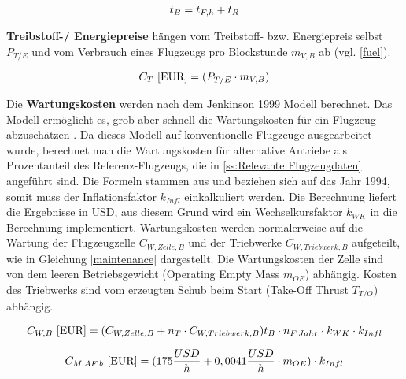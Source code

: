 \begin{equation}
   t_{B} = t_{F,h} + t_{R} \\
   \label{blockzeit}
\end{equation}

\textbf{Treibstoff-/ Energiepreise} hängen vom Treibstoff- bzw. Energiepreis selbst $P_{T/E}$ und vom Verbrauch 
eines Flugzeugs pro Blockstunde $m_{V,B}$ ab (vgl. \eqref{fuel}).

\begin{equation}
   {C_T ~[\text{EUR}]} = (P_{T/E} \cdot m_{V,B}) \\
   \label{fuel}
\end{equation}

Die \textbf{Wartungskosten} werden nach dem Jenkinson 1999 Modell berechnet. Das Modell ermöglicht es, grob aber schnell die Wartungskosten 
für ein Flugzeug abzuschätzen \cite{bruge2018wartungskosten}.
Da dieses Modell auf konventionelle Flugzeuge ausgearbeitet wurde, berechnet man die Wartungskosten für alternative Antriebe
als Prozentanteil des Referenz-Flugzeugs, die in \ref{ss:Relevante Flugzeugdaten} angeführt sind.
Die Formeln stammen aus \cite{bruge2018wartungskosten} und beziehen sich auf das Jahr 1994, somit muss der Inflationsfaktor $k_{Infl}$
einkalkuliert werden. Die Berechnung liefert die Ergebnisse in USD, aus diesem Grund wird ein Wechselkursfaktor $k_{WK}$ in die Berechnung implementiert.
Wartungskosten werden normalerweise auf die Wartung der Flugzeugzelle $C_{W,Zelle,B}$ und der Triebwerke 
$C_{W,Triebwerk,B}$ aufgeteilt, wie in Gleichung \eqref{maintenance} dargestellt. Die Wartungskosten der Zelle sind von dem leeren Betriebsgewicht 
(Operating Empty Mass $m_{OE}$) abhängig. Kosten des Triebwerks sind vom erzeugten Schub beim Start (Take-Off Thrust $T_{T/O}$) abhängig.

\begin{equation}
   {C_{W,B} ~[\text{EUR}]} = (C_{W,Zelle,B} + n_{T} \cdot C_{W,Triebwerk,B} ) t_{B} \cdot n_{F, Jahr} \cdot k_{WK} \cdot k_{Infl}\\
   \label{maintenance}
\end{equation}

\begin{equation}
   {C_{M,AF,b} ~[\text{EUR}]} = (175 \frac{USD}{h} + 0,0041 \frac{USD}{h} \cdot m_{OE} )\cdot k_{Infl}\\
   \label{maintenance Zelle}
\end{equation}

